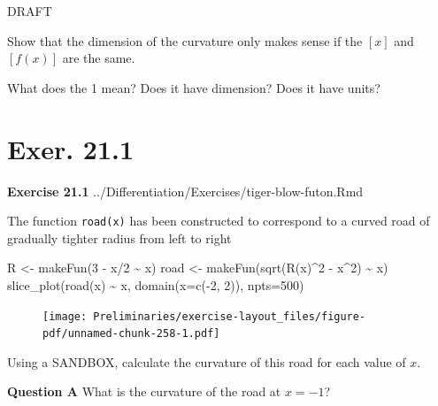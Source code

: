 \documentclass[
  letterpaper,
  DIV=11,
  numbers=noendperiod,
  oneside]{article}
\newenvironment{Shaded}{\begin{snugshade}}{\end{snugshade}}
\newcommand{\AttributeTok}[1]{\textcolor[rgb]{0.40,0.45,0.13}{#1}}
\newcommand{\DecValTok}[1]{\textcolor[rgb]{0.68,0.00,0.00}{#1}}
\newcommand{\FunctionTok}[1]{\textcolor[rgb]{0.28,0.35,0.67}{#1}}
\newcommand{\NormalTok}[1]{\textcolor[rgb]{0.00,0.23,0.31}{#1}}
\newcommand{\OtherTok}[1]{\textcolor[rgb]{0.00,0.23,0.31}{#1}}
\newcommand{\SpecialCharTok}[1]{\textcolor[rgb]{0.37,0.37,0.37}{#1}}
\begin{document}
\begin{multicols}{2}
DRAFT

Show that the dimension of the curvature only makes sense if the \([x]\)
and \([f(x)]\) are the same.

What does the 1 mean? Does it have dimension? Does it have units?

\hypertarget{exer.-21.1-1}{%
\section*{Exer. 21.1}\label{exer.-21.1-1}}

\textbf{Exercise 21.1} ../Differentiation/Exercises/tiger-blow-futon.Rmd

The function \texttt{road(x)} has been constructed to correspond to a
curved road of gradually tighter radius from left to right

\begin{Shaded}
\begin{Highlighting}[]
\NormalTok{R }\OtherTok{\textless{}{-}} \FunctionTok{makeFun}\NormalTok{(}\DecValTok{3} \SpecialCharTok{{-}}\NormalTok{ x}\SpecialCharTok{/}\DecValTok{2} \SpecialCharTok{\textasciitilde{}}\NormalTok{ x)}
\NormalTok{road }\OtherTok{\textless{}{-}} \FunctionTok{makeFun}\NormalTok{(}\FunctionTok{sqrt}\NormalTok{(}\FunctionTok{R}\NormalTok{(x)}\SpecialCharTok{\^{}}\DecValTok{2} \SpecialCharTok{{-}}\NormalTok{ x}\SpecialCharTok{\^{}}\DecValTok{2}\NormalTok{) }\SpecialCharTok{\textasciitilde{}}\NormalTok{ x)}
\FunctionTok{slice\_plot}\NormalTok{(}\FunctionTok{road}\NormalTok{(x) }\SpecialCharTok{\textasciitilde{}}\NormalTok{ x, }\FunctionTok{domain}\NormalTok{(}\AttributeTok{x=}\FunctionTok{c}\NormalTok{(}\SpecialCharTok{{-}}\DecValTok{2}\NormalTok{, }\DecValTok{2}\NormalTok{)), }\AttributeTok{npts=}\DecValTok{500}\NormalTok{)}
\end{Highlighting}
\end{Shaded}

\begin{figure}[H]

{\centering \texttt{[image: Preliminaries/exercise-layout\_files/figure-pdf/unnamed-chunk-258-1.pdf]}

}

\end{figure}

Using a SANDBOX, calculate the curvature of this road for each value of
\(x\).

\textbf{Question A} What is the curvature of the road at \(x=-1\)?


\end{multicols}
\end{document}
